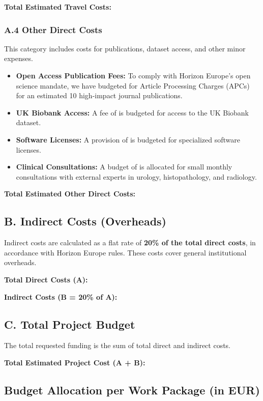 \textbf{Total Estimated Travel Costs: }

\subsubsection*{A.4 Other Direct Costs}
This category includes costs for publications, dataset access, and other minor expenses.
\begin{itemize}
    \item \textbf{Open Access Publication Fees:} To comply with Horizon Europe's open science mandate, we have budgeted for Article Processing Charges (APCs) for an estimated 10 high-impact journal publications.
    \item \textbf{UK Biobank Access:} A fee of  is budgeted for access to the UK Biobank dataset.
    \item \textbf{Software Licenses:} A provision of  is budgeted for specialized software licenses.
    \item \textbf{Clinical Consultations:} A budget of  is allocated for small monthly consultations with external experts in urology, histopathology, and radiology.
\end{itemize}

\textbf{Total Estimated Other Direct Costs: }

\subsection*{B. Indirect Costs (Overheads)}
Indirect costs are calculated as a flat rate of \textbf{20\% of the total direct costs}, in accordance with Horizon Europe rules. These costs cover general institutional overheads.

\textbf{Total Direct Costs (A): }

\textbf{Indirect Costs (B = 20\% of A): }

\subsection*{C. Total Project Budget}
The total requested funding is the sum of total direct and indirect costs.

\textbf{Total Estimated Project Cost (A + B):} 

\subsection*{Budget Allocation per Work Package (in EUR)}

